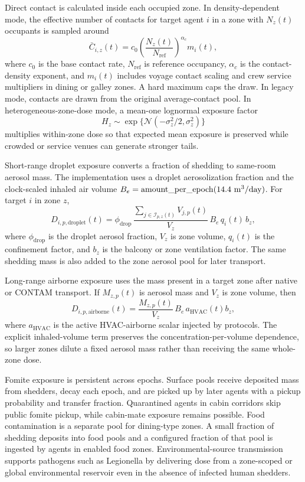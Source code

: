 Direct contact is calculated inside each occupied zone. In density-dependent mode, the effective number of contacts for target agent $i$ in a zone with $N_z(t)$ occupants is sampled around
\begin{equation}
\bar{C}_{i,z}(t)=c_0\left(\frac{N_z(t)}{N_{\mathrm{ref}}}\right)^{\alpha_c}m_i(t),
\end{equation}
where $c_0$ is the base contact rate, $N_{\mathrm{ref}}$ is reference occupancy, $\alpha_c$ is the contact-density exponent, and $m_i(t)$ includes voyage contact scaling and crew service
multipliers in dining or galley zones. A hard maximum caps the draw. In legacy mode, contacts are drawn from the original average-contact pool. In heterogeneous-zone-dose mode, a mean-one
lognormal exposure factor
\begin{equation}
H_z\sim\exp\{\mathcal{N}(-\sigma_z^2/2,\sigma_z^2)\}
\end{equation}
multiplies within-zone dose so that expected mean exposure is preserved while crowded or service venues can generate stronger tails.

Short-range droplet exposure converts a fraction of shedding to same-room aerosol mass. The implementation uses a droplet aerosolization fraction and the clock-scaled inhaled air volume
$B_e=\operatorname{amount\_per\_epoch}(14.4\ {\rm m^3/day})$. For target $i$ in zone $z$,
\begin{equation}
D_{i,p,\mathrm{droplet}}(t)=\phi_{\mathrm{drop}}\,
\frac{\sum_{j\in\mathcal{I}_{p,z}(t)}V_{j,p}(t)}{V_z}\,
B_e\,q_i(t)\,b_z,
\end{equation}
where $\phi_{\mathrm{drop}}$ is the droplet aerosol fraction, $V_z$ is zone volume, $q_i(t)$ is the confinement factor, and $b_z$ is the balcony or zone ventilation
factor. The same shedding mass is also added to the zone aerosol pool for later transport.

Long-range airborne exposure uses the mass present in a target zone after native or CONTAM transport. If $M_{z,p}(t)$ is aerosol mass and $V_z$ is zone volume, then
\begin{equation}
D_{i,p,\mathrm{airborne}}(t)=\frac{M_{z,p}(t)}{V_z}\,B_e\,a_{\mathrm{HVAC}}(t)b_z,
\end{equation}
where $a_{\mathrm{HVAC}}$ is the active HVAC-airborne scalar injected by protocols. The explicit inhaled-volume term preserves the concentration-per-volume dependence, so larger zones dilute a fixed aerosol mass rather than receiving the same whole-zone dose.

Fomite exposure is persistent across epochs. Surface pools receive deposited mass from shedders, decay each epoch, and are picked up by later agents with a pickup probability and transfer
fraction. Quarantined agents in cabin corridors skip public fomite pickup, while cabin-mate exposure remains possible. Food contamination is a separate pool for dining-type zones. A small
fraction of shedding deposits into food pools and a configured fraction of that pool is ingested by agents in enabled food zones. Environmental-source transmission supports pathogens such as
Legionella by delivering dose from a zone-scoped or global environmental reservoir even in the absence of infected human shedders.


